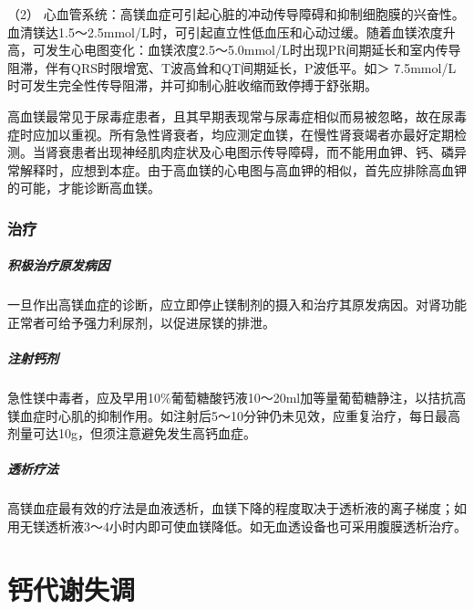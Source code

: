 （2）
心血管系统：高镁血症可引起心脏的冲动传导障碍和抑制细胞膜的兴奋性。血清镁达1.5～2.5mmol/L时，可引起直立性低血压和心动过缓。随着血镁浓度升高，可发生心电图变化：血镁浓度2.5～5.0mmol/L时出现PR间期延长和室内传导阻滞，伴有QRS时限增宽、T波高耸和QT间期延长，P波低平。如＞
7.5mmol/L时可发生完全性传导阻滞，并可抑制心脏收缩而致停搏于舒张期。

高血镁最常见于尿毒症患者，且其早期表现常与尿毒症相似而易被忽略，故在尿毒症时应加以重视。所有急性肾衰者，均应测定血镁，在慢性肾衰竭者亦最好定期检测。当肾衰患者出现神经肌肉症状及心电图示传导障碍，而不能用血钾、钙、磷异常解释时，应想到本症。由于高血镁的心电图与高血钾的相似，首先应排除高血钾的可能，才能诊断高血镁。

\subsection{治疗}

\paragraph{积极治疗原发病因}

一旦作出高镁血症的诊断，应立即停止镁制剂的摄入和治疗其原发病因。对肾功能正常者可给予强力利尿剂，以促进尿镁的排泄。

\paragraph{注射钙剂}

急性镁中毒者，应及早用10\%葡萄糖酸钙液10～20ml加等量葡萄糖静注，以拮抗高镁血症时心肌的抑制作用。如注射后5～10分钟仍未见效，应重复治疗，每日最高剂量可达10g，但须注意避免发生高钙血症。

\paragraph{透析疗法}

高镁血症最有效的疗法是血液透析，血镁下降的程度取决于透析液的离子梯度；如用无镁透析液3～4小时内即可使血镁降低。如无血透设备也可采用腹膜透析治疗。

\protect\hypertarget{text00199.html}{}{}

\chapter{钙代谢失调}

